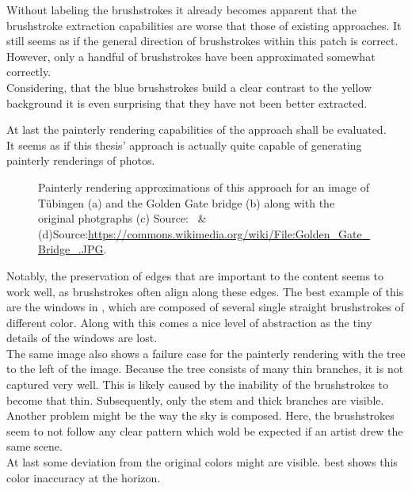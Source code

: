 Without labeling the brushstrokes it already becomes apparent that the brushstroke extraction capabilities are worse that those of existing approaches.
It still seems as if the general direction of brushstrokes within this patch is correct.
However, only a handful of brushstrokes have been approximated somewhat correctly.\\
Considering, that the blue brushstrokes build a clear contrast to the yellow background it is even surprising that they have not been better extracted.

At last the painterly rendering capabilities of the approach shall be evaluated.\\
It seems as if this thesis' approach is actually quite capable of generating painterly renderings of photos.
\begin{figure}[!htp]
    \caption{Painterly rendering approximations of this approach for an image of Tübingen (a) and the Golden Gate bridge (b) along with the original photgraphs (c) Source:~\cite{gatys} \& (d)Source:\url{https://commons.wikimedia.org/wiki/File:Golden_Gate_Bridge_.JPG}.}
\end{figure}
Notably, the preservation of edges that are important to the content seems to work well, as brushstrokes often align along these edges.
The best example of this are the windows in , which are composed of several single straight brushstrokes of different color.
Along with this comes a nice level of abstraction as the tiny details of the windows are lost.\\
The same image also shows a failure case for the painterly rendering with the tree to the left of the image.
Because the tree consists of many thin branches, it is not captured very well.
This is likely caused by the inability of the brushstrokes to become that thin.
Subsequently, only the stem and thick branches are visible.\\
Another problem might be the way the sky is composed.
Here, the brushstrokes seem to not follow any clear pattern which wold be expected if an artist drew the same scene.\\
At last some deviation from the original colors might are visible.
 best shows this color inaccuracy at the horizon.

